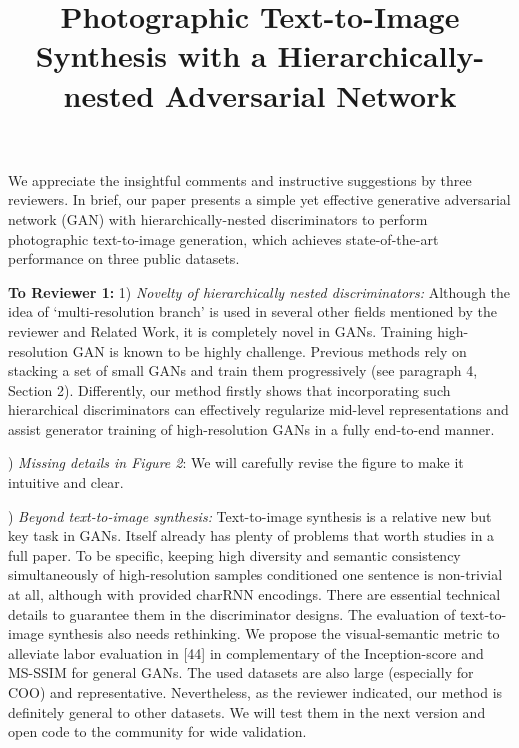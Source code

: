\documentclass[10pt,twocolumn,letterpaper]{article}
\begin{document}
\title{Photographic Text-to-Image Synthesis with a Hierarchically-nested Adversarial Network}  %

\maketitle
\thispagestyle{empty}

\noindent
We appreciate the insightful comments and instructive suggestions by three reviewers. In brief, our paper presents a simple yet effective generative adversarial network (GAN) with hierarchically-nested discriminators to perform photographic text-to-image generation, which achieves state-of-the-art performance on three public datasets.

\noindent
\textbf{To Reviewer 1:} 1) \textit{Novelty of hierarchically nested discriminators:} Although the idea of `multi-resolution branch' is used in several other fields mentioned by the reviewer and Related Work, it is completely novel in GANs. Training high-resolution GAN is known to be highly challenge. Previous methods rely on stacking a set of small GANs and train them progressively (see paragraph 4, Section 2). Differently, our method firstly shows that incorporating such hierarchical discriminators can effectively regularize mid-level representations and assist generator training of high-resolution GANs in a fully end-to-end manner.

) \textit{Missing details in Figure 2}: We will carefully revise the figure to make it intuitive and clear.

) \textit{Beyond text-to-image synthesis:} Text-to-image synthesis is a relative new but key task in GANs. Itself already has plenty of problems that worth studies in a full paper. To be specific, keeping high diversity and semantic consistency simultaneously of high-resolution samples conditioned one sentence is non-trivial at all, although with provided charRNN encodings. There are essential technical details to guarantee them in the discriminator designs. 
The evaluation of text-to-image synthesis also needs rethinking. We propose the visual-semantic metric to alleviate labor evaluation in [44] in complementary of the Inception-score and MS-SSIM for general GANs. The used datasets are also large (especially for COO) and representative. 
Nevertheless, as the reviewer indicated, our method is definitely general to other datasets. We will test them in the next version and open code to the community for wide validation.
\end{document}
